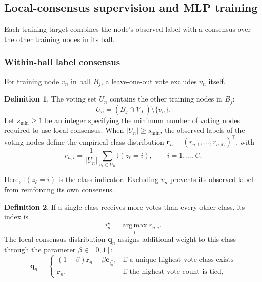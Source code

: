 \documentclass[times,review,10pt]{elsarticle}
\theoremstyle{definition}
\newtheorem{definition}{Definition}
\theoremstyle{plain}
\begin{document}


\subsection{Local-consensus supervision and MLP training}\label{sec:3.3}

Each training target combines the node's observed label with a consensus over the other training nodes in its ball.

\subsubsection{Within-ball label consensus}\label{sec:3.3.1}

For training node \(v_n\) in ball \(B_j\), a leave-one-out vote excludes \(v_n\) itself.

\begin{definition}
The voting set \(U_n\) contains the other training nodes in \(B_j\):
\begin{equation}\label{eq:7}
U_n=(B_j\cap\mathcal V_L)\setminus\{v_n\}.
\end{equation}
Let \(s_{\min}\geq1\) be an integer specifying the minimum number of voting nodes required to use local consensus. When \(|U_n|\geq s_{\min}\), the observed labels of the voting nodes define the empirical class distribution \(\mathbf r_n=(r_{n,1},\ldots,r_{n,C})^\top\), with
\begin{equation}\label{eq:8}
r_{n,i}=\frac{1}{|U_n|}\sum_{v_\ell\in U_n}\mathbb I(z_\ell=i),
\qquad i=1,\ldots,C.
\end{equation}
\end{definition}

Here, \(\mathbb I(z_\ell=i)\) is the class indicator. Excluding \(v_n\) prevents its observed label from reinforcing its own consensus.

\begin{definition}
If a single class receives more votes than every other class, its index is
\begin{equation}\label{eq:9}
i_n^\star=\operatorname*{arg\,max}_i r_{n,i}.
\end{equation}
The local-consensus distribution \(\mathbf q_n\) assigns additional weight to this class through the parameter \(\beta\in[0,1]\):
\begin{equation}\label{eq:10}
\mathbf q_n=
\begin{cases}
(1-\beta)\mathbf r_n+\beta\mathbf e_{i_n^\star},&\text{if a unique highest-vote class exists}\\
\mathbf r_n,&\text{if the highest vote count is tied},
\end{cases}
\end{equation}
\end{definition}
\end{document}
